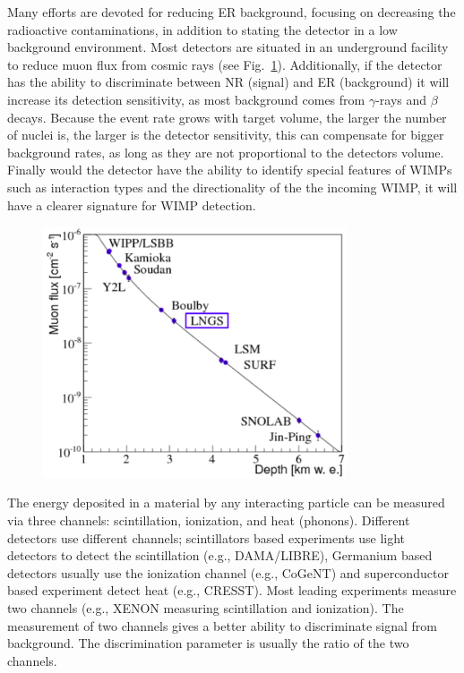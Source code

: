 Many efforts are devoted for reducing ER background, focusing on decreasing the radioactive contaminations, in addition to stating the detector in a low background environment. Most detectors are situated in an underground facility to reduce muon flux from cosmic rays (see Fig.~\ref{fig:MuonRed}). Additionally, if the detector has the ability to discriminate between NR (signal) and ER (background) it will increase its detection sensitivity, as most background comes from $\gamma$-rays and $\beta$ decays. Because the event rate grows with target volume, the larger the number of nuclei is, the larger is the detector sensitivity, this can compensate for bigger background rates, as long as they are not proportional to the detectors volume. Finally would the detector have the ability to identify special features of WIMPs such as interaction types and the directionality of the the incoming WIMP, it will have a clearer signature for WIMP detection.

\begin{figure}[]
	\centering
	\includegraphics[width=0.8\textwidth]{figs/muones.png}
	\label{fig:MuonRed}
\end{figure}

The energy deposited in a material by any interacting particle can be measured via three channels: scintillation, ionization, and heat (phonons). Different detectors use different channels; scintillators based experiments use light detectors to detect the scintillation (e.g., DAMA/LIBRE), Germanium based detectors usually use the ionization channel (e.g., CoGeNT) and superconductor based experiment detect heat (e.g., CRESST). Most leading experiments measure two channels (e.g., XENON measuring scintillation and ionization). The measurement of two channels gives a better ability to discriminate signal from background. The discrimination parameter is usually the ratio of the two channels.  

